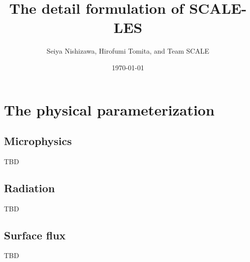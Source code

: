 \documentclass[a4paper]{report}
\title{{\LARGE The detail formulation of SCALE-LES}}
\author{Seiya Nishizawa, Hirofumi Tomita, and Team SCALE}
\date{\today}
\begin{document}
\maketitle
\tableofcontents











\chapter{The physical parameterization}


\section{Microphysics}
{\Huge TBD}

\section{Radiation}
{\Huge TBD}

\section{Surface flux}
{\Huge TBD}




\end{document}
